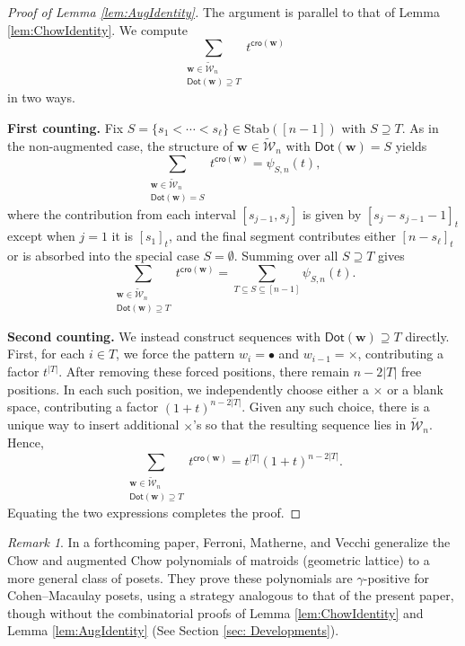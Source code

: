 \documentclass[reqno]{amsart}
\newcommand{\Stab}{{\mathrm{Stab}}}
\newcommand{\cro}{{\mathsf{cro}}}
\renewcommand{\Dot}{{\mathsf{Dot}}}
\theoremstyle{definition}
\theoremstyle{remark}
\newtheorem{rem}{Remark}[section]
\begin{document}
\begin{proof}[Proof of Lemma \ref{lem:AugIdentity}]
The argument is parallel to that of Lemma \ref{lem:ChowIdentity}. We compute
\[
\sum_{\substack{\mathbf{w}\in\widetilde{\mathcal{W}}_n\\ \Dot(\mathbf{w})\supseteq T}} t^{\cro(\mathbf{w})}
\]
in two ways.

\noindent \textbf{First counting.}
Fix $S=\{s_1<\cdots<s_\ell\}\in\Stab([n-1])$ with $S\supseteq T$. As in the non-augmented case, the structure of $\mathbf{w}\in\widetilde{\mathcal{W}}_n$ with $\Dot(\mathbf{w})=S$ yields
\[
\sum_{\substack{\mathbf{w}\in\widetilde{\mathcal{W}}_n\\ \Dot(\mathbf{w})=S}} t^{\cro(\mathbf{w})}
=\psi_{S,n}(t),
\]
where the contribution from each interval $[s_{j-1},s_j]$ is given by $[s_j-s_{j-1}-1]_t$ except when $j=1$ it is $[s_1]_t$, and the final segment contributes either $[n-s_\ell]_t$ or is absorbed into the special case $S=\emptyset$. Summing over all $S\supseteq T$ gives
\[
\sum_{\substack{\mathbf{w}\in\widetilde{\mathcal{W}}_n\\ \Dot(\mathbf{w})\supseteq T}} t^{\cro(\mathbf{w})}
=\sum_{T\subseteq S\subseteq [n-1]} \psi_{S,n}(t).
\]

\smallskip

\noindent \textbf{Second counting.}
We instead construct sequences with $\Dot(\mathbf{w})\supseteq T$ directly. First, for each $i\in T$, we force the pattern $w_i=\bullet$ and $w_{i-1}=\times$, contributing a factor $t^{|T|}$.
After removing these forced positions, there remain $n-2|T|$ free positions. 
In each such position, we independently choose either a $\times$ or a blank space, contributing a factor $(1+t)^{n-2|T|}$.
Given any such choice, there is a unique way to insert additional $\times$'s so that the resulting sequence lies in $\widetilde{\mathcal{W}}_n$. Hence,
\[
\sum_{\substack{\mathbf{w}\in\widetilde{\mathcal{W}}_n\\ \Dot(\mathbf{w})\supseteq T}} t^{\cro(\mathbf{w})}
= t^{|T|}(1+t)^{n-2|T|}.
\]
Equating the two expressions completes the proof.
\end{proof}


\begin{rem} \label{rem: ChowPoset}
In a forthcoming paper, Ferroni, Matherne, and Vecchi \cite{FMVChowPoly} generalize the Chow and augmented Chow polynomials of matroids (geometric lattice) to a more general class of posets. 
They prove these polynomials are $\gamma$-positive for Cohen--Macaulay posets, using a strategy analogous to that of the present paper, though without the combinatorial proofs of Lemma \ref{lem:ChowIdentity} and Lemma \ref{lem:AugIdentity} (See Section \ref{sec: Developments}).
\end{rem}
\end{document}
